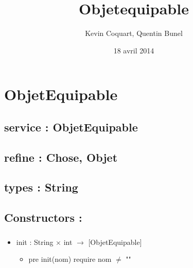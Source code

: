 \documentclass[11pt]{article}
\title{Objetequipable}
\author{Kevin Coquart, Quentin Bunel}
\date{18 avril 2014}
\begin{document}
\maketitle

\setcounter{tocdepth}{3}
\tableofcontents
\vspace*{1cm}
\section{ObjetEquipable}
\label{sec-1}

\subsection{service : ObjetEquipable}
\label{sec-1.1}

\subsection{refine : Chose, Objet}
\label{sec-1.2}

\subsection{types : String}
\label{sec-1.3}


\subsection{Constructors :}
\label{sec-1.4}

\subsubsection{}

\begin{itemize}

\item init : String $\times$ int $\to$ [ObjetEquipable]\\
\label{sec-1.4.1.1}

\begin{itemize}

\item pre init(nom) require nom $\neq$ ""\\
\label{sec-1.4.1.1.1}

\end{itemize} %
\end{itemize} %
\end{document}
